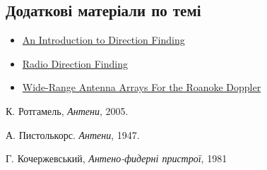 \documentclass{article}
\begin{document}

\subsection{Додаткові матеріали по темі}
\begin{itemize}[noitemsep, topsep=8pt]
\item \href{https://www.youtube.com/watch?v=N8rZIAHxAH4}{An Introduction to Direction Finding}
\item \href{https://www.cryptomuseum.com/df/df.htm}{Radio Direction Finding}	
\item \href{http://www.homingin.com/newdopant.html}{Wide-Range Antenna Arrays For the Roanoke Doppler}
\end{itemize}


\begin{thebibliography}{99}

К. Ротгамель, \textit{Антени}, 2005.

А. Пистолькорс. \textit{Антени}, 1947.

Г. Кочержевський, \textit{Антено-фидерні пристрої}, 1981

\end{thebibliography}
\end{document}

